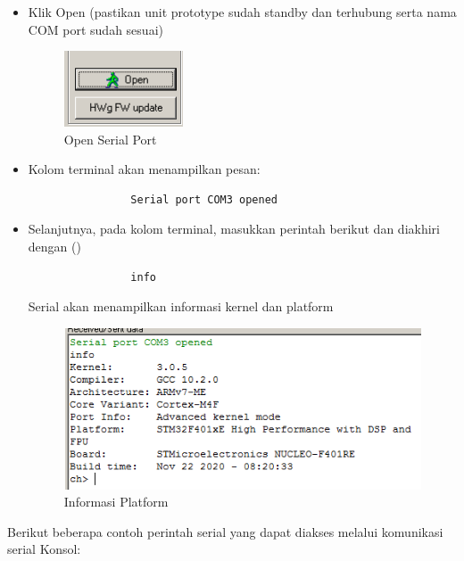 \documentclass{article}
\begin{document}
\begin{enumerate}
\begin{itemize}
			\item Klik Open (pastikan unit prototype sudah standby dan terhubung
			serta nama COM port sudah sesuai)
			
			\begin{figure}[!ht]
				\centering
				\includegraphics[width=100pt]{images/software/hercules_open}
				\caption{Open Serial Port}
			\end{figure}
			
			\item Kolom terminal akan menampilkan pesan:
			\begin{verbatim}
				Serial port COM3 opened
			\end{verbatim}
			
			\item Selanjutnya, pada kolom terminal,
			masukkan perintah berikut dan diakhiri dengan (\keys{\return})
			\begin{verbatim}
				info
			\end{verbatim}
			Serial akan menampilkan informasi kernel dan platform
			\begin{figure}[!ht]
				\centering
				\includegraphics[width=300pt]{images/software/hercules_text}
				\caption{Informasi Platform}
			\end{figure}
		\end{itemize}
		
	\end{enumerate}

	Berikut beberapa contoh perintah serial yang dapat diakses melalui komunikasi serial Konsol:
	
\end{document}
